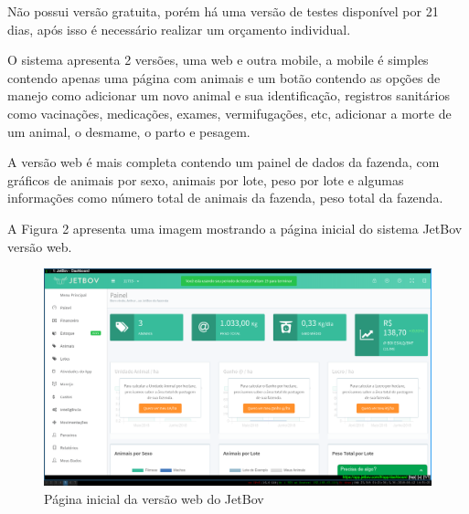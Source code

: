 \documentclass[12pt]{article}
\begin{document}
Não possui versão gratuita, porém há uma versão de testes disponível por 21 dias, após isso é necessário realizar um orçamento individual.

O sistema apresenta 2 versões, uma web e outra mobile, a mobile é simples contendo apenas uma página com animais e um botão contendo as opções de manejo como adicionar um novo animal e sua identificação, registros sanitários como vacinações, medicações, exames, vermifugações, etc, adicionar a morte de um animal, o desmame, o parto e pesagem.

A versão web é mais completa contendo um painel de dados da fazenda, com gráficos de animais por sexo, animais por lote, peso por lote e algumas informações como número total de animais da fazenda, peso total da fazenda. 

A Figura 2 apresenta uma imagem mostrando a página inicial do sistema JetBov versão web.

\begin{figure}[!h]
	\begin{center}
		\caption{Página inicial da versão web do JetBov}
		\includegraphics[width=6in]{img/jetbov.png}

	\end{center}
\end{figure}



\end{document}
